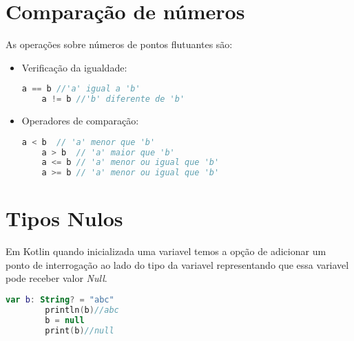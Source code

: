 \section{Comparação de números}

As operações sobre números de pontos flutuantes são:


\begin{itemize}
\item
  Verificação da igualdade:  
  \begin{lstlisting}[label={lst:example1}, language=Kotlin]
    a == b //'a' igual a 'b'
    a != b //'b' diferente de 'b'
  \end{lstlisting}

  \item
  Operadores de comparação:  
  \begin{lstlisting}[label={lst:example1}, language=Kotlin]
    a < b  // 'a' menor que 'b' 
    a > b  // 'a' maior que 'b'
    a <= b // 'a' menor ou igual que 'b'
    a >= b // 'a' menor ou igual que 'b'
  \end{lstlisting}
\end{itemize}

\section{Tipos Nulos}
Em Kotlin quando inicializada uma variavel
    temos a opção de adicionar um ponto de interrogação
    ao lado do tipo da variavel representando que essa variavel pode
    receber valor \emph{Null}.
    
    \begin{lstlisting}[label={lst:example1}, language=Kotlin]
        var b: String? = "abc" 
        println(b)//abc
        b = null
        print(b)//null
    \end{lstlisting}

